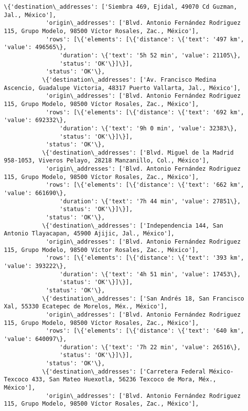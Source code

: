 \documentclass[11pt]{article}
\begin{document}
\begin{Verbatim}[commandchars=\\\{\}]
           \{'destination\_addresses': ['Siembra 469, Ejidal, 49070 Cd Guzman, Jal., México'],
            'origin\_addresses': ['Blvd. Antonio Fernández Rodriguez 115, Grupo Modelo, 98500 Víctor Rosales, Zac., México'],
            'rows': [\{'elements': [\{'distance': \{'text': '497 km', 'value': 496565\},
                'duration': \{'text': '5h 52 min', 'value': 21105\},
                'status': 'OK'\}]\}],
            'status': 'OK'\},
           \{'destination\_addresses': ['Av. Francisco Medina Ascencio, Guadalupe Victoria, 48317 Puerto Vallarta, Jal., México'],
            'origin\_addresses': ['Blvd. Antonio Fernández Rodriguez 115, Grupo Modelo, 98500 Víctor Rosales, Zac., México'],
            'rows': [\{'elements': [\{'distance': \{'text': '692 km', 'value': 692332\},
                'duration': \{'text': '9h 0 min', 'value': 32383\},
                'status': 'OK'\}]\}],
            'status': 'OK'\},
           \{'destination\_addresses': ['Blvd. Miguel de la Madrid 958-1053, Viveros Pelayo, 28218 Manzanillo, Col., México'],
            'origin\_addresses': ['Blvd. Antonio Fernández Rodriguez 115, Grupo Modelo, 98500 Víctor Rosales, Zac., México'],
            'rows': [\{'elements': [\{'distance': \{'text': '662 km', 'value': 661690\},
                'duration': \{'text': '7h 44 min', 'value': 27851\},
                'status': 'OK'\}]\}],
            'status': 'OK'\},
           \{'destination\_addresses': ['Independencia 144, San Antonio Tlayacapan, 45900 Ajijic, Jal., México'],
            'origin\_addresses': ['Blvd. Antonio Fernández Rodriguez 115, Grupo Modelo, 98500 Víctor Rosales, Zac., México'],
            'rows': [\{'elements': [\{'distance': \{'text': '393 km', 'value': 393222\},
                'duration': \{'text': '4h 51 min', 'value': 17453\},
                'status': 'OK'\}]\}],
            'status': 'OK'\},
           \{'destination\_addresses': ['San Andrés 18, San Francisco Xal, 55330 Ecatepec de Morelos, Méx., México'],
            'origin\_addresses': ['Blvd. Antonio Fernández Rodriguez 115, Grupo Modelo, 98500 Víctor Rosales, Zac., México'],
            'rows': [\{'elements': [\{'distance': \{'text': '640 km', 'value': 640097\},
                'duration': \{'text': '7h 22 min', 'value': 26516\},
                'status': 'OK'\}]\}],
            'status': 'OK'\},
           \{'destination\_addresses': ['Carretera Federal México-Texcoco 433, San Mateo Huexotla, 56236 Texcoco de Mora, Méx., México'],
            'origin\_addresses': ['Blvd. Antonio Fernández Rodriguez 115, Grupo Modelo, 98500 Víctor Rosales, Zac., México'],

\end{Verbatim}
\end{document}
